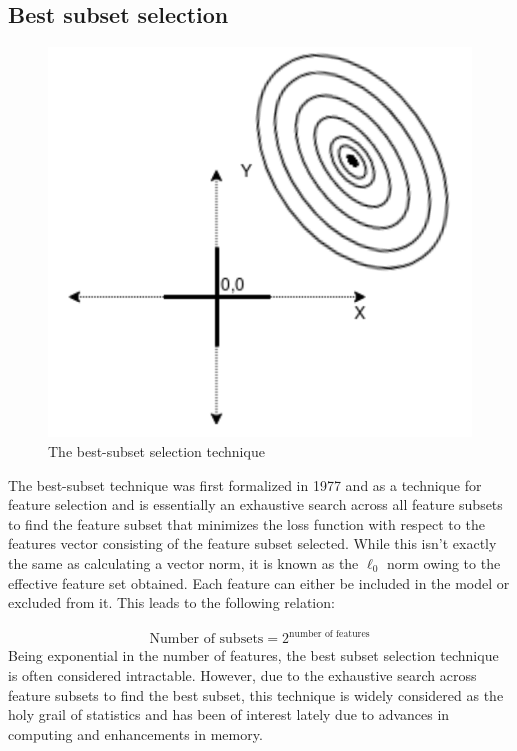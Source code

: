 \documentclass[a4paper,12pt]{article}
\begin{document}
\newpage
\subsection{Best subset selection}

\begin{figure}[H]
    \centering
    \includegraphics[scale=0.4]{best-subset.png}
    \caption{The best-subset selection technique}
    \label{fig:ALAMO Flowchart}
\end{figure}

The best-subset technique \cite{narendra1977branch,john1994irrelevant,kohavi1997wrappers} was first formalized in 1977 and as a technique for feature selection and is essentially an exhaustive search across all feature subsets to find the feature subset that minimizes the loss function with respect to the features vector consisting of the feature subset selected. While this isn't exactly the same as calculating a vector norm, it is known as the $\ell_0$ norm owing to the effective feature set obtained. Each feature can either be included in the model or excluded from it. This leads to the following relation:

\begin{eqnarray}
\textrm{Number of subsets} = 2^{\textrm{number of features}}
\end{eqnarray}
Being exponential in the number of features, the best subset selection technique is often considered intractable. However, due to the exhaustive search across feature subsets to find the best subset, this technique is widely considered as the holy grail of statistics and has been of interest lately due to advances in computing and enhancements in memory.
\end{document}
